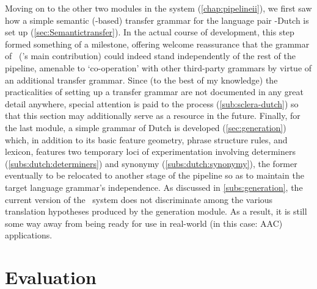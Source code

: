 Moving on to the other two modules in the system (\cref{chap:pipelineii}), we
first saw how a simple semantic (\mrs-based) transfer grammar for the language
pair \sclera-Dutch is set up (\cref{sec:Semantictransfer}). In the actual
course of development, this step formed something of a milestone, offering
welcome reassurance that the grammar of \sclera\ (\depicto's main contribution)
could indeed stand independently of the rest of the pipeline, amenable to
`co-operation' with other third-party grammars by virtue of an additional
transfer grammar. Since (to the best of my knowledge) the practicalities of
setting up a transfer grammar are not documented in any great detail anywhere,
special attention is paid to the process (\cref{sub:sclera-dutch}) so that this
section may additionally serve as a resource in the future. Finally, for the
last module, a simple grammar of Dutch is developed (\cref{sec:generation})
which, in addition to its basic feature geometry, phrase structure rules, and
lexicon, features two temporary loci of experimentation involving determiners
(\cref{subs:dutch:determiners}) and synonymy (\cref{subs:dutch:synonymy}), the
former eventually to be relocated to another stage of the pipeline so as to
maintain the target language grammar's independence. As discussed in
\cref{subs:generation}, the current version of the \depicto\ system does not
discriminate among the various translation hypotheses produced by the
generation module. As a result, it is still some way away from being ready for
use in real-world (in this case: AAC) applications.


\section{Evaluation}

